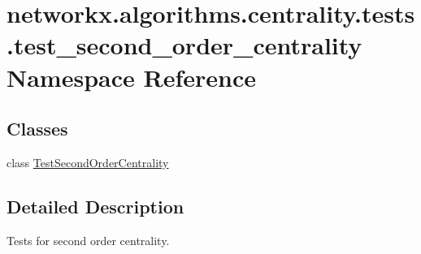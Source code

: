 \hypertarget{namespacenetworkx_1_1algorithms_1_1centrality_1_1tests_1_1test__second__order__centrality}{}\section{networkx.\+algorithms.\+centrality.\+tests.\+test\+\_\+second\+\_\+order\+\_\+centrality Namespace Reference}
\label{namespacenetworkx_1_1algorithms_1_1centrality_1_1tests_1_1test__second__order__centrality}
\subsection*{Classes}
\begin{DoxyCompactItemize}
\item 
class \hyperlink{classnetworkx_1_1algorithms_1_1centrality_1_1tests_1_1test__second__order__centrality_1_1TestSecondOrderCentrality}{Test\+Second\+Order\+Centrality}
\end{DoxyCompactItemize}


\subsection{Detailed Description}
\begin{DoxyVerb}Tests for second order centrality.
\end{DoxyVerb}
 